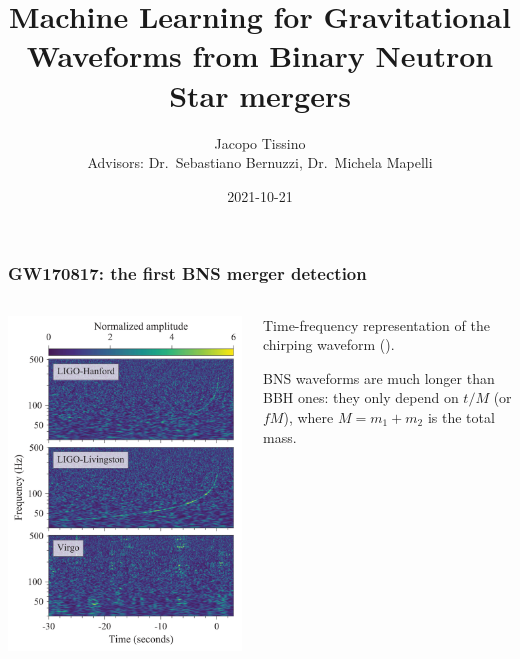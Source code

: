 \documentclass{beamer}
\title{Machine Learning for Gravitational Waveforms from Binary Neutron Star mergers}
\author{Jacopo Tissino \\ Advisors: Dr.\ Sebastiano Bernuzzi, Dr.\ Michela Mapelli}
\date{2021-10-21}
\begin{document}
\frame{\titlepage}

\begin{frame}
    \frametitle{GW170817: the first BNS merger detection}
    \begin{columns}
        
    \begin{column}{0.5\textwidth}
    \includegraphics[width=\textwidth]{figures/836px-GW170817_spectrograms.svg.png}
    \end{column}

    \begin{column}{0.5\textwidth}
    Time-frequency representation of the chirping waveform
    (\cite[]{abbottGW170817ObservationGravitational2017}).

    BNS waveforms are much longer than BBH ones: they only depend on \(t/M \) (or \(fM\)), where \(M = m_1 + m_2 \) is the total mass.
    \end{column}
    \end{columns}
\end{frame}
\end{document}
